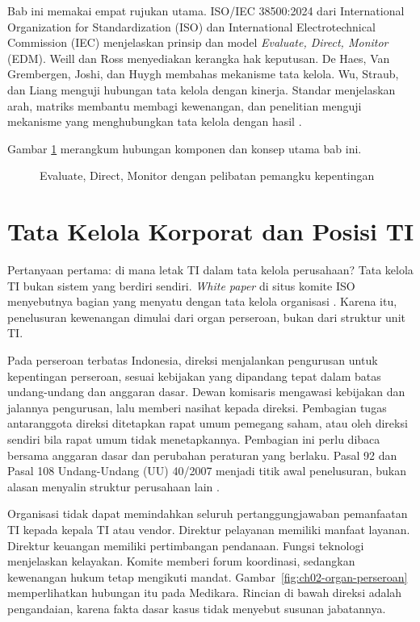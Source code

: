 Bab ini memakai empat rujukan utama. ISO/IEC 38500:2024 dari International Organization
for Standardization (ISO) dan International Electrotechnical Commission (IEC) menjelaskan
prinsip dan model \textit{Evaluate, Direct, Monitor} (EDM). Weill dan Ross menyediakan
kerangka hak keputusan. De Haes, Van Grembergen, Joshi, dan Huygh membahas mekanisme tata
kelola. Wu, Straub, dan Liang menguji hubungan tata kelola dengan kinerja. Standar
menjelaskan arah, matriks membantu membagi kewenangan, dan penelitian menguji mekanisme
yang menghubungkan tata kelola dengan hasil
\cite{iso38500-2024,weill2004,dehaes2020,wu2015}.

Gambar \ref{fig:ch02-ilustrasi-bab} merangkum hubungan komponen dan konsep utama bab ini.
\begin{figure}[!htb]
  \centering
  
  \caption{Evaluate, Direct, Monitor dengan pelibatan pemangku kepentingan}
  \label{fig:ch02-ilustrasi-bab}
\end{figure}

\section{Tata Kelola Korporat dan Posisi TI}

Pertanyaan pertama: di mana letak TI dalam tata kelola perusahaan? Tata kelola TI bukan
sistem yang berdiri sendiri. \textit{White paper} di situs komite ISO menyebutnya bagian yang
menyatu dengan tata kelola organisasi \cite{c02-iso-perubahan}. Karena itu, penelusuran
kewenangan dimulai dari organ perseroan, bukan dari struktur unit TI.

Pada perseroan terbatas Indonesia, direksi menjalankan pengurusan untuk kepentingan
perseroan, sesuai kebijakan yang dipandang tepat dalam batas undang-undang dan anggaran
dasar. Dewan komisaris mengawasi kebijakan dan jalannya pengurusan, lalu memberi nasihat
kepada direksi. Pembagian tugas antaranggota direksi ditetapkan rapat umum pemegang saham,
atau oleh direksi sendiri bila rapat umum tidak menetapkannya. Pembagian ini perlu dibaca
bersama anggaran dasar dan perubahan peraturan yang berlaku. Pasal 92 dan Pasal 108
Undang-Undang (UU) 40/2007 menjadi titik awal penelusuran, bukan alasan menyalin struktur
perusahaan lain \cite{c02-uu40}.

Organisasi tidak dapat memindahkan seluruh pertanggungjawaban pemanfaatan TI kepada kepala
TI atau vendor. Direktur pelayanan memiliki manfaat layanan. Direktur keuangan memiliki
pertimbangan pendanaan. Fungsi teknologi menjelaskan kelayakan. Komite memberi forum
koordinasi, sedangkan kewenangan hukum tetap mengikuti mandat.
Gambar~\ref{fig:ch02-organ-perseroan} memperlihatkan hubungan itu pada Medikara. Rincian di
bawah direksi adalah pengandaian, karena fakta dasar kasus tidak menyebut susunan
jabatannya.

